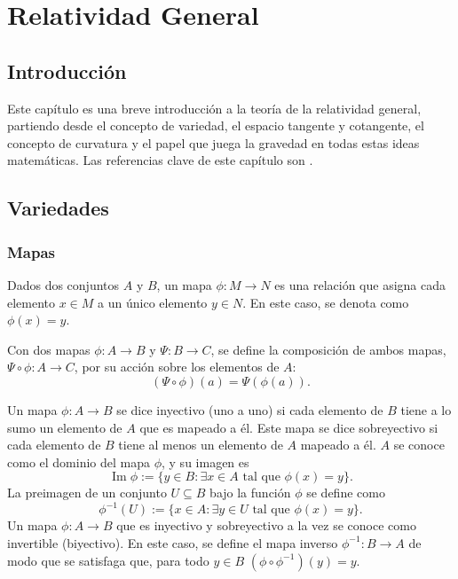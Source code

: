 \chapter{Relatividad General}
\section{Introducción}
Este capítulo es una breve introducción a la teoría de la relatividad general, partiendo desde el concepto de variedad, el espacio tangente y cotangente, el concepto de curvatura y el papel que juega la gravedad en todas estas ideas matemáticas. Las referencias clave de este capítulo son \cite{Carroll,Munkres,bishop_goldberg_1980,wald_2010}.
\section{Variedades}
\subsection{Mapas}
\begin{defi}[Mapa]
	Dados dos conjuntos $A$ y $B$, un mapa $\phi:M\rightarrow N$ es una relación que asigna cada elemento $x\in M$ a un único elemento $y\in N$. En este caso, se denota como $\phi(x)=y$.
\end{defi}
\begin{defi}
	Con dos mapas $\phi:A\rightarrow B$ y $\Psi:B\rightarrow C$, se define la composición de ambos mapas, $\Psi\circ\phi:A\rightarrow C$, por su acción sobre los elementos de $A$:
	$$(\Psi\circ\phi)(a)=\Psi(\phi(a)).$$
\end{defi}
\begin{center}
\end{center}

Un mapa $\phi:A\rightarrow B$ se dice inyectivo (uno a uno) si cada elemento de $B$ tiene a lo sumo un elemento de $A$ que es mapeado a él. Este mapa se dice sobreyectivo si cada elemento de $B$ tiene al menos un elemento de $A$ mapeado a él. $A$ se conoce como el dominio del mapa $\phi$, y su imagen es
$$\mathop{Im}\phi:=\{y\in B: \exists x\in A \text{ tal que }\phi(x)=y\}.$$
La preimagen de un conjunto $U\subseteq B$ bajo la función $\phi$ se define como
$$\phi^{-1}(U):=\{ x\in A: \exists y \in U \text{ tal que }\phi(x)=y\}.$$
Un mapa $\phi:A\rightarrow B$ que es inyectivo y sobreyectivo a la vez se conoce como invertible (biyectivo). En este caso, se define el mapa inverso $\phi^{-1}:B\rightarrow A$ de modo que se satisfaga que, para todo $y\in B$ $(\phi\circ\phi^{-1})(y)=y.$
\begin{center}
\end{center}


